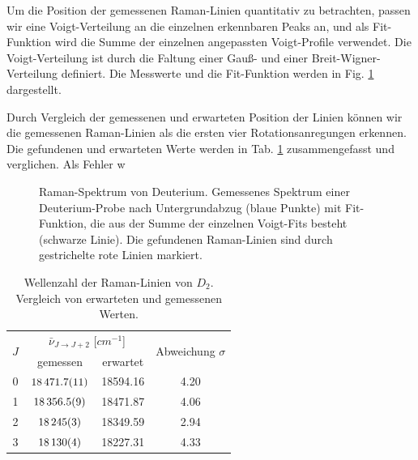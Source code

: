 \documentclass[11pt]{article}
\begin{document}
Um die Position der gemessenen Raman-Linien quantitativ zu betrachten, passen wir eine Voigt-Verteilung an die einzelnen erkennbaren Peaks an, und als Fit-Funktion wird die Summe der einzelnen angepassten Voigt-Profile verwendet. Die Voigt-Verteilung ist durch die Faltung einer Gauß- und einer Breit-Wigner-Verteilung definiert. Die Messwerte und die Fit-Funktion werden in Fig. \ref{fig:Deuterium} dargestellt. 

Durch Vergleich der gemessenen und erwarteten Position der Linien können wir die gemessenen Raman-Linien als die ersten vier Rotationsanregungen erkennen. Die gefundenen und erwarteten Werte werden in Tab. \ref{tab:D2} zusammengefasst und verglichen. Als Fehler w

\begin{figure}[htbp]
	\centering
   \caption{\small Raman-Spektrum von Deuterium. Gemessenes Spektrum einer Deuterium-Probe nach Untergrundabzug (blaue Punkte) mit Fit-Funktion, die aus der Summe der einzelnen Voigt-Fits besteht (schwarze Linie). Die gefundenen Raman-Linien sind durch gestrichelte rote Linien markiert.}
   \label{fig:Deuterium}
\end{figure}

\begin{table}[!htbp]
 \begin{center}
  \caption{\small Wellenzahl der Raman-Linien von $D_2$. Vergleich von erwarteten und gemessenen Werten.}
   \renewcommand{\arraystretch}{1.3} %
  \label{tab:D2}
  \begin{tabular}{|c|c|c|c|}
  \hline
\multirow{2}{*}{$J$}& \multicolumn{2}{c|}{$\bar{\nu}_{J\to J+2}$ [$\unit{cm^{-1}}$]} &  \multirow{2}{*}{ Abweichung $\sigma$} \\ \cline{2-3} %
 					 & gemessen & erwartet &    			\\ 
  \hline
	\hline 
0 & $\num{18471.7\pm 1.1}$	& 18594.16	& 4.20 \\
1 & $\num{18356.5	\pm 0.9}$	& 18471.87	& 4.06 \\
2 & $\num{18245\pm 3}$	& 18349.59	& 2.94	 \\
3 & $\num{18130\pm 4}$	& 18227.31	& 4.33 \\
	\hline
  \end{tabular}
  \renewcommand{\arraystretch}{1} 

 \end{center}
\end{table}
\end{document}
